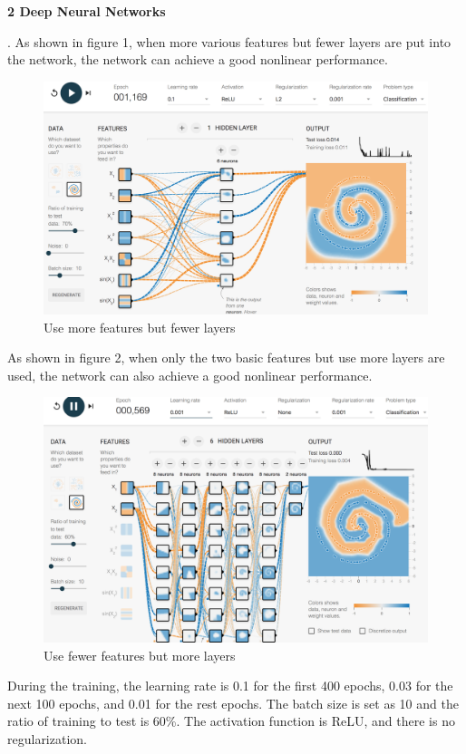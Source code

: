 \documentclass[12pt]{article}
\begin{document}
\bigskip
{\large \bf 2 Deep Neural Networks}
\par
{}. As shown in figure 1, when more various features but fewer layers are put into the network, the network can achieve a good nonlinear performance.
\begin{figure}[ht]
\centering
\includegraphics[scale=0.35]{1.png}
\caption{Use more features but fewer layers}
\label{fig:pathdemo}
\end{figure}
\par
As shown in figure 2, when only the two basic features but use more layers are used, the network can also achieve a good nonlinear performance.
\begin{figure}[ht]
\centering
\includegraphics[scale=0.35]{2.png}
\caption{Use fewer features but more layers}
\end{figure}
\par
During the training, the learning rate is 0.1 for the first 400 epochs, 0.03 for the next 100 epochs, and 0.01 for the rest epochs. The batch size is set as 10 and the ratio of training to test is 60\%. The activation function is ReLU, and there is no regularization.
\end{document}
